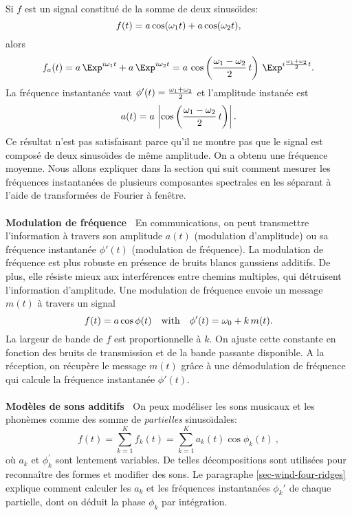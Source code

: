 Si $f$ est un  signal constitu\'{e} de la somme de deux 
sinuso\"{\i}des:
\[
f (t) =  a \cos({ {\omega}_1 t}) + a \cos({ {\omega}_2 t}) ,
\]
alors
\[
f_a (t) = a \,\Exp^{i \om_1 t} + a \,\Exp^{i \om_2 t} =
 a \, \cos \left( \frac {\om_1 - \om_2} 2\, t \right)
\,\Exp^{i \frac {\om_1 + \om_2} 2 t}.  
\]
La fr\'{e}quence instantan\'{e}e vaut
$\phi'(t) = \frac {{\omega}_1 + {\omega}_2} 2$
et l'amplitude instan\'ee est
\[
a(t) = a \, \left| \cos \left(\frac {{\omega}_1 - {\omega}_2} 2 \,t\right)\right| .
\]
Ce r\'{e}sultat n'est pas satisfaisant parce qu'il ne montre pas que 
le signal est compos\'{e} de deux sinuso\"{\i}des de m\^{e}me 
amplitude. On a obtenu une fr\'{e}quence moyenne. Nous allons 
expliquer dans la section qui suit comment mesurer les 
fr\'{e}quences instantan\'{e}es de plusieurs composantes spectrales en 
les s\'{e}parant \`{a} l'aide de transform\'{e}es de Fourier 
\`a fen\^{e}tre.
\\
\\
{\bf Modulation de fr\'{e}quence\ }
En communications, on peut transmettre l'information \`{a} travers 
son amplitude $a(t)$ (modulation d'amplitude) ou sa fr\'{e}quence 
instantan\'{e}e $\phi'(t)$ (modulation de fr\'{e}quence).
La modulation de fr\'{e}quence est plus robuste en pr\'{e}sence de 
bruits blancs gaussiens additifs. De plus, elle r\'{e}siste 
mieux aux 
interf\'{e}rences entre chemins 
multiples, qui d\'{e}truisent l'information d'amplitude. Une 
modulation de fr\'{e}quence envoie un message $m(t)$ \`{a} 
travers un signal
\[
f(t) = a \cos \phi (t)~~~\mbox{with}~~~ 
\phi'(t) = {\omega}_0 + k \,m(t) .
\]
La largeur de bande de $f$ est proportionnelle \`{a} $k$. On 
ajuste cette constante en fonction des bruits de transmission et de la 
bande passante disponible. A la r\'{e}ception, on r\'{e}cup\`{e}re le 
message $m(t)$ gr\^{a}ce \`{a} une d\'{e}modulation de fr\'{e}quence 
qui calcule la fr\'{e}quence instantan\'{e}e $\phi'(t)$.
\\
\\
{\bf Mod\`{e}les de sons additifs\ }
On peux mod\'{e}liser les sons musicaux et les phon\`{e}mes comme des somme de
{\it partielles} sinuso\"{\i}dales: 
\begin{equation}
\label{NewSoundMOd}
f(t) = \sum_{k=1}^K f_k (t) =  \sum_{k=1}^K a_k (t) \cos \phi_k (t)~ ,
\end{equation}
o\`{u} $a_k$ et $\phi^\prime_k$	sont lentement variables.
De telles d\'{e}compositions sont 
utilis\'{e}es pour reconna\^{i}tre des formes et modifier des sons.
Le paragraphe \ref{sec-wind-four-ridges} explique
comment calculer les $a_k$ et les fr\'{e}quences instantan\'{e}es 
$\phi_k'$ de chaque partielle, 
dont on d\'{e}duit la phase $\phi_k$ par 
int\'{e}gration.

